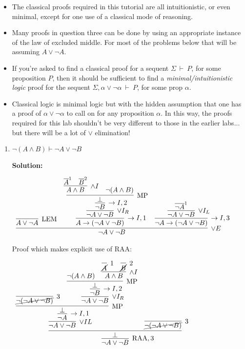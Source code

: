 \documentclass[11pt]{report}
\newcommand{\temp}[2]{{\overline{#2}}^{#1}}
\begin{document}
\begin{enumerate}
	\begin{itemize}
		\item[] The classical proofs required in this tutorial are all intuitionistic, or even minimal, except for one use of a classical mode of reasoning. 
		\item[] Many proofs in question three can be done by using an appropriate instance of the law of excluded middle. For most of the problems below that will be assuming $A \lor \lnot A$. 
		\item[] If you're asked to find a classical proof for a sequent $\Sigma \ \vdash \ P$, for some proposition $P$, then it should be sufficient to find a \emph{minimal/intuitionistic logic} proof for the sequent $\Sigma, \alpha \lor \lnot \alpha \ \vdash \ P$, for some prop $\alpha$. 
		\item[] Classical logic is minimal logic but with the hidden assumption that one has a proof of $\alpha \lor \lnot \alpha$ to call on for any proposition $\alpha$. In this way, the proofs required for this lab shouldn't be very different to those in the earlier labs... but there will be a lot of $\lor$ elimination!  
	\end{itemize}


	\newpage
	\begin{enumerate}
		\item $\neg(A \land  B) \vdash  \neg  A \lor \neg  B$  
		
		\textbf{Solution:}

		\begin{center}
			$\begin{array}{c}
				\infer[\lor E]{\lnot A \lor \lnot B}
					{\infer[\LEM]{A \lor \lnot A}{}
					&
					\infer[\to I, 1]{A \to (\lnot A \lor \lnot B)}
						{\infer[\lor I_{R}]{\lnot A \lor \lnot B}
							{\infer[\to I,2]{\lnot B}
								{\infer[\MP]{\bot}
									{\infer[\land I]{A \land B}
										{\temp{1}{A}&\temp{2}{B}}
									&
									\lnot(A \land B)}}}}
					&
					\infer[\to I,3]{\lnot A \to (\lnot A \lor \lnot B)}
						{\infer[\lor I_{L}]{\lnot A \lor \lnot B}
							{\temp{1}{\lnot A}}}}
			\end{array}$
		\end{center}

		Proof which makes explicit use of RAA: 

		\begin{center}
				$\begin{array}{c}
					\infer[\RAA,3]{\lnot A \lor \lnot B}
						{\infer[]{\bot}
							{\infer[\lor I{L}]{\lnot A \lor \lnot B}
								{\infer[\to I,1]{\lnot A}
									{\infer[\MP]{\bot}
										{\infer[3]{\cancel{\lnot(\lnot A \lor \lnot B)}}
											{}
										&
										\infer[\lor I_{R}]{\lnot A \lor \lnot B}
											{\infer[\to I,2]{\lnot B}
												{\infer[\MP]{\bot}
													{\lnot(A \land B)
													&
													\infer[\land I]{A \land B}
														{\infer[1]{\cancel{A}}{}
														&
														\infer[2]{\cancel{B}}{}}}}}}}}
							&
							\infer[3]{\cancel{\lnot(\lnot A \lor \lnot B)}}{}}}
				\end{array}$
			\end{center}
		

\end{enumerate}
\end{enumerate}
\end{document}

